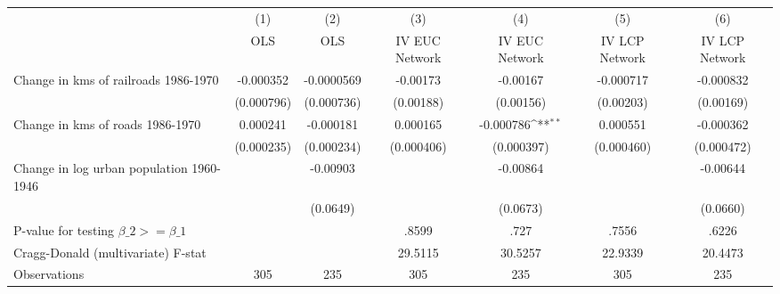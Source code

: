 {
\def\sym#1{\ifmmode^{#1}\else\(^{#1}\)\fi}
\begin{tabular}{l*{6}{c}}
\hline\hline
                &\multicolumn{1}{c}{(1)}&\multicolumn{1}{c}{(2)}&\multicolumn{1}{c}{(3)}&\multicolumn{1}{c}{(4)}&\multicolumn{1}{c}{(5)}&\multicolumn{1}{c}{(6)}\\
                &\multicolumn{1}{c}{OLS}&\multicolumn{1}{c}{OLS}&\multicolumn{1}{c}{IV EUC Network}&\multicolumn{1}{c}{IV EUC Network}&\multicolumn{1}{c}{IV LCP Network}&\multicolumn{1}{c}{IV LCP Network}\\
\hline
Change in kms of railroads 1986-1970&-0.000352         &-0.0000569         & -0.00173         & -0.00167         &-0.000717         &-0.000832         \\
                &(0.000796)         &(0.000736)         &(0.00188)         &(0.00156)         &(0.00203)         &(0.00169)         \\
[1em]
Change in kms of roads 1986-1970& 0.000241         &-0.000181         & 0.000165         &-0.000786\sym{**} & 0.000551         &-0.000362         \\
                &(0.000235)         &(0.000234)         &(0.000406)         &(0.000397)         &(0.000460)         &(0.000472)         \\
[1em]
Change in log urban population 1960-1946&                  & -0.00903         &                  & -0.00864         &                  & -0.00644         \\
                &                  & (0.0649)         &                  & (0.0673)         &                  & (0.0660)         \\
\hline
P-value for testing $\beta\_{2} >= \beta\_{1}$&                  &                  &    .8599         &     .727         &    .7556         &    .6226         \\
Cragg-Donald (multivariate) F-stat&                  &                  &  29.5115         &  30.5257         &  22.9339         &  20.4473         \\
Observations    &      305         &      235         &      305         &      235         &      305         &      235         \\
\hline\hline
\end{tabular}
}
